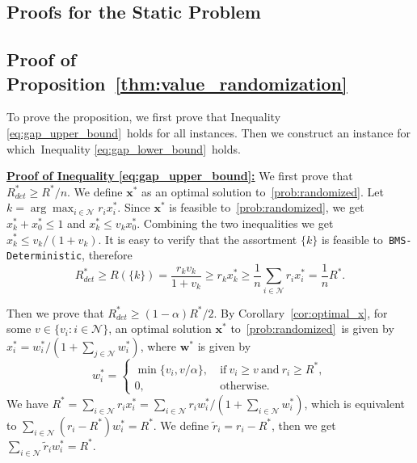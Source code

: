\documentclass[mnsc,non-blindrev]{informs3}
\theoremstyle{definition}
\begin{document}
\newpage

\begin{appendices}{\Large{}}

\section{Proofs for the Static Problem}

\subsection{Proof of Proposition~\ref{thm:value_randomization}}\label{sec:thm:value_randomization}
To prove the proposition, we first prove that Inequality \eqref{eq:gap_upper_bound}~holds for all instances. Then we construct an instance for which~Inequality \eqref{eq:gap_lower_bound}~holds.

\noindent\underline{\bf Proof of Inequality \eqref{eq:gap_upper_bound}:} We first prove that $R^*_{det}\geq R^*/n$. We define $\bm{x}^*$ as an optimal solution to~\ref{prob:randomized}. Let $k=\arg\max_{i\in\mathcal{N}}r_ix_i^*$. Since $\bm{x}^*$ is feasible to~\ref{prob:randomized}, we get $x_{k}^*+x_0^*\leq 1$ and $x_{k}^*\leq v_{k}x_0^*$. Combining the two inequalities we get $x_{k}^*\leq v_{k}/(1+v_{k})$. It is easy to verify that the assortment $\{k\}$ is feasible to~\texttt{BMS-Deterministic}, therefore
\begin{equation}
R^*_{det}\geq R(\{k\})=\dfrac{r_{k}v_{k}}{1+v_{k}}\geq r_{k}x_{k}^*\geq \dfrac{1}{n}\sum_{i\in\mathcal{N}}r_ix_i^*=\dfrac{1}{n}R^*.\label{eq:gap_upper_bound_1}
\end{equation}

Then we prove that $R^*_{det}\geq (1-\alpha)R^*/2$. By Corollary~\ref{cor:optimal_x}, for some $v\in\{v_i:i\in\mathcal{N}\}$, an optimal solution $\bm{x}^*$ to~\ref{prob:randomized}~is given by $x_i^*=w_i^*/(1+\sum_{j\in\mathcal{N}}w_i^*)$, where $\bm{w}^*$ is given by
\begin{equation*}
w_i^*=\begin{cases}
\min\{v_i,v/\alpha\},\ &\text{if}\ v_i\geq v\ \text{and}\ r_i\geq R^*,\\
0,\ &\text{otherwise}.
\end{cases}
\end{equation*}
We have $R^*=\sum_{i\in\mathcal{N}}r_ix_i^*=\sum_{i\in\mathcal{N}}r_iw_i^*/(1+\sum_{i\in\mathcal{N}}w_i^*)$, which is equivalent to $\sum_{i\in\mathcal{N}}(r_i-R^*)w_i^*=R^*$. We define $\tilde{r}_i=r_i-R^*$, then we get $\sum_{i\in\mathcal{N}}\tilde{r}_iw_i^*=R^*$.


\end{appendices}
\end{document}
